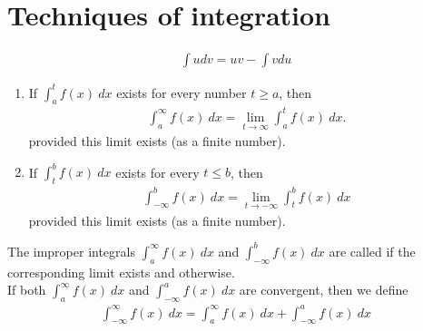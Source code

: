 \documentclass{article}
\begin{document}
\section{Techniques of integration}
\begin{theorem}
    \begin{align*}
        \int u dv = uv - \int v du
    \end{align*}
\end{theorem}
\begin{definition}
    \begin{enumerate}
        \item If $\int_a^t f(x)\:dx$ exists for every number $t\geq a$, then
        \begin{align*}
            \int_a^\infty f(x)\:dx = \lim_{t\to \infty}\int_a^t f(x)\:dx.
        \end{align*}
        provided this limit exists (as a finite number).
        \item If $\int_t^b f(x)\:dx$ exists for every $t\leq b$, then
        \begin{align*}
            \int_{-\infty}^b f(x)\: dx = \lim_{t\to-\infty}\int_t^b f(x)\:dx
        \end{align*}
        provided this limit exists (as a finite number).
    \end{enumerate}
    The improper integrals $\int_a^\infty f(x)\:dx$ and $\int_{-\infty}^b f(x)\:dx$ are called  if the corresponding limit exists and  otherwise.\\
    If both  $\int_a^\infty f(x)\:dx$ and $\int_{-\infty}^a f(x)\:dx$ are convergent, then we define
    \begin{align*}
        \int_{-\infty}^\infty f(x)\:dx = \int_a^\infty f(x)\:dx + \int_{-\infty}^a f(x)\:dx
    \end{align*}
\end{definition}
\end{document}
